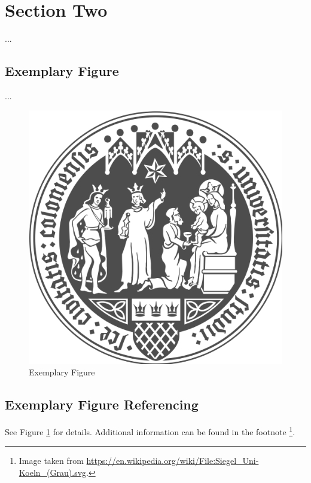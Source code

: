 \clearpage
\section{Section Two}
\label{sec:Section_Name}
...
\subsection{Exemplary Figure}
\label{subsec:Section_Name/fig}
...
\begin{figure}[htbp]
    \centering
    \includegraphics[width=.5\linewidth]{./Figures/UoC_Logo.png}
    \caption{Exemplary Figure}
    \label{fig:UoC}
\end{figure}


\subsection{Exemplary Figure Referencing}
\label{subsec:Section_Name/fig_rfs}

See Figure \ref{fig:UoC} for details. Additional information can be
found in the footnote \footnote{Image taken from \url{https://en.wikipedia.org/wiki/File:Siegel_Uni-Koeln_(Grau).svg}.}.
